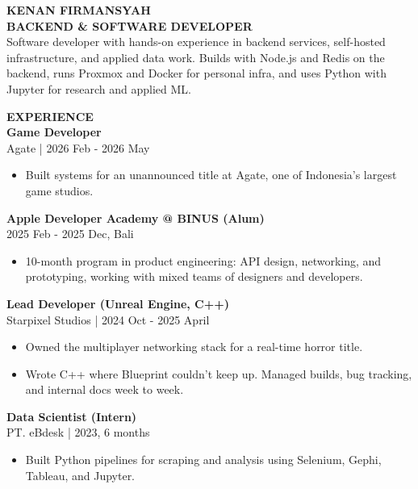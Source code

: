 \documentclass[11pt,a4paper]{article}
\newcommand{\mainsection}[1]{%
    {\large\bfseries\MakeUppercase{#1}}\\[8pt]%
}
\newcommand{\jobentry}[2]{%
    \textbf{#1}\\
    {\small\color{lighttext}#2}\\[4pt]%
}
\begin{document}
\begin{minipage}[t]{14cm}
\vspace{0.5cm}
\hspace{0.8cm}
\begin{minipage}[t]{12.5cm}

{\Huge\bfseries\MakeUppercase{Kenan Firmansyah}}\\[6pt]
{\large\bfseries BACKEND \& SOFTWARE DEVELOPER}\\[12pt]

{\small Software developer with hands-on experience in backend services, self-hosted infrastructure, and applied data work. Builds with Node.js and Redis on the backend, runs Proxmox and Docker for personal infra, and uses Python with Jupyter for research and applied ML.}

\vspace{0.5cm}

\mainsection{Experience}

\jobentry{Game Developer}{Agate | 2026 Feb - 2026 May}
\begin{itemize}[leftmargin=*, nosep, itemsep=2pt, topsep=2pt]
    \item Built systems for an unannounced title at Agate, one of Indonesia's largest game studios.
\end{itemize}

\vspace{0.3cm}

\jobentry{Apple Developer Academy @ BINUS (Alum)}{2025 Feb - 2025 Dec, Bali}
\begin{itemize}[leftmargin=*, nosep, itemsep=2pt, topsep=2pt]
    \item 10-month program in product engineering: API design, networking, and prototyping, working with mixed teams of designers and developers.
\end{itemize}

\vspace{0.3cm}

\jobentry{Lead Developer (Unreal Engine, C++)}{Starpixel Studios | 2024 Oct - 2025 April}
\begin{itemize}[leftmargin=*, nosep, itemsep=2pt, topsep=2pt]
    \item Owned the multiplayer networking stack for a real-time horror title.
    \item Wrote C++ where Blueprint couldn't keep up. Managed builds, bug tracking, and internal docs week to week.
\end{itemize}

\vspace{0.3cm}

\jobentry{Data Scientist (Intern)}{PT. eBdesk | 2023, 6 months}
\begin{itemize}[leftmargin=*, nosep, itemsep=2pt, topsep=2pt]
    \item Built Python pipelines for scraping and analysis using Selenium, Gephi, Tableau, and Jupyter.
\end{itemize}

\end{minipage}
\end{minipage}
\end{document}
